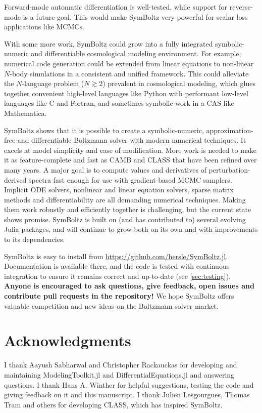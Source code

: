 \documentclass{aa}
\begin{document}
Forward-mode automatic differentiation is well-tested, while support for reverse-mode is a future goal.
This would make SymBoltz very powerful for scalar loss applications like MCMCs.

With some more work, SymBoltz could grow into a fully integrated symbolic-numeric and differentiable cosmological modeling environment.
For example, numerical code generation could be extended from linear equations to non-linear $N$-body simulations in a consistent and unified framework.
This could alleviate the $N$-language problem ($N \gtrsim 2$) prevalent in cosmological modeling, which glues together convenient high-level languages like Python with performant low-level languages like C and Fortran, and sometimes symbolic work in a CAS like Mathematica.

SymBoltz shows that it is possible to create a symbolic-numeric, approximation-free and differentiable Boltzmann solver with modern numerical techniques.
It excels at model simplicity and ease of modification.
More work is needed to make it as feature-complete and fast as CAMB and CLASS that have been refined over many years.
A major goal is to compute values and derivatives of perturbation-derived spectra fast enough for use with gradient-based MCMC samplers.
Implicit ODE solvers, nonlinear and linear equation solvers, sparse matrix methods and differentiability are all demanding numerical techniques.
Making them work robustly and efficiently together is challenging, but the current state shows promise.
SymBoltz is built on (and has contributed to) several evolving Julia packages, and will continue to grow both on its own and with improvements to its dependencies.

SymBoltz is easy to install from \url{https://github.com/hersle/SymBoltz.jl}.
Documentation is available there, and the code is tested with continuous integration to ensure it remains correct and up-to-date (see \cref{sec:testing}).
\textbf{Anyone is encouraged to ask questions, give feedback, open issues and contribute pull requests in the repository!}
We hope SymBoltz offers valuable competition and new ideas on the Boltzmann solver market.

\section*{Acknowledgments}

I thank Aayush Sabharwal and Christopher Rackauckas for developing and maintaining ModelingToolkit.jl and DifferentialEquations.jl and answering questions.
I thank Hans A. Winther for helpful suggestions, testing the code and giving feedback on it and this manuscript.
I thank Julien Lesgourgues, Thomas Tram and others for developing CLASS, which has inspired SymBoltz.
\end{document}
